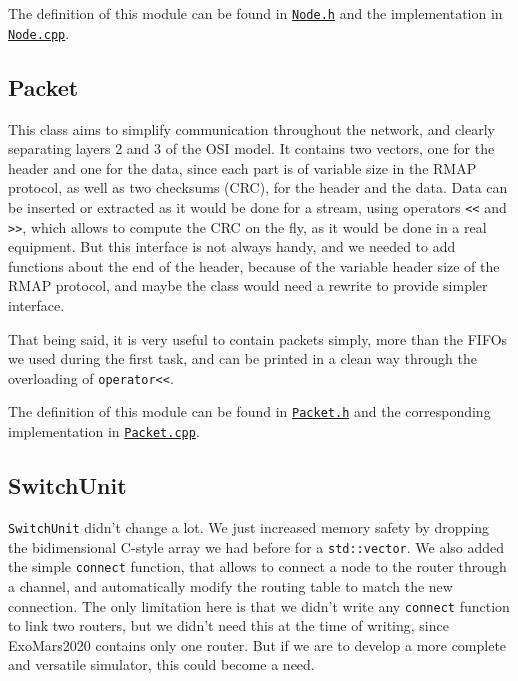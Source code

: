 \documentclass[12pt,a4paper]{article}
\begin{document}
The definition of this module can be found in \href{https://github.com/suai-ipsa2018/ExoMars2020/blob/master/ExoMars2020/Network/Node.h}{\texttt{Node.h}} and the implementation in \href{https://github.com/suai-ipsa2018/ExoMars2020/blob/master/ExoMars2020/Network/Node.cpp}{\texttt{Node.cpp}}.

\subsection{Packet}
This class aims to simplify communication throughout the network, and clearly separating layers 2 and 3 of the OSI model. It contains two vectors, one for the header and one for the data, since each part is of variable size in the RMAP protocol, as well as two checksums (CRC), for the header and the data. Data can be inserted or extracted as it would be done for a stream, using operators \verb|<<| and \verb|>>|, which allows to compute the CRC on the fly, as it would be done in a real equipment. But this interface is not always handy, and we needed to add functions about the end of the header, because of the variable header size of the RMAP protocol, and maybe the class would need a rewrite to provide simpler interface.

That being said, it is very useful to contain packets simply, more than the FIFOs we used during the first task, and can be printed in a clean way through the overloading of  \verb|operator<<|.

The definition of this module can be found in \href{https://github.com/suai-ipsa2018/ExoMars2020/blob/master/ExoMars2020/Network/Packet.h}{\texttt{Packet.h}} and the corresponding implementation in \href{https://github.com/suai-ipsa2018/ExoMars2020/blob/master/ExoMars2020/Network/Packet.cpp}{\texttt{Packet.cpp}}.
\subsection{SwitchUnit}
\texttt{SwitchUnit} didn't change a lot. We just increased memory safety by dropping the bidimensional C-style array we had before for a \texttt{std::vector}. We also added the simple \texttt{connect} function, that allows to connect a node to the router through a channel, and automatically modify the routing table to match the new connection. The only limitation here is that we didn't write any \texttt{connect} function to link two routers, but we didn't need this at the time of writing, since ExoMars2020 contains only one router. But if we are to develop a more complete and versatile simulator, this could become a need.
\end{document}
